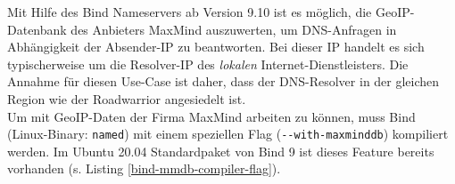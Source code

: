 Mit Hilfe des Bind Nameservers ab Version 9.10 ist es möglich, die \gls{GeoIP}-Datenbank des Anbieters MaxMind auszuwerten, um \gls{DNS}-Anfragen in Abhängigkeit der Absender-IP zu beantworten\cite{bindgeoip2020}. Bei dieser IP handelt es sich typischerweise um die Resolver-IP des \textit{lokalen} Internet-Dienstleisters. Die Annahme für diesen Use-Case ist daher, dass der \gls{DNS}-Resolver in der gleichen Region wie der \gls{Roadwarrior} angesiedelt ist\label{dns-resolver-region}.\\
Um mit \gls{GeoIP}-Daten der Firma MaxMind arbeiten zu können, muss Bind (Linux-Binary: \texttt{named}) mit einem speziellen Flag (\texttt{-{}-with-maxminddb}) kompiliert werden. Im Ubuntu 20.04 Standardpaket von Bind 9 ist dieses Feature bereits vorhanden (s. Listing \ref{bind-mmdb-compiler-flag}).

